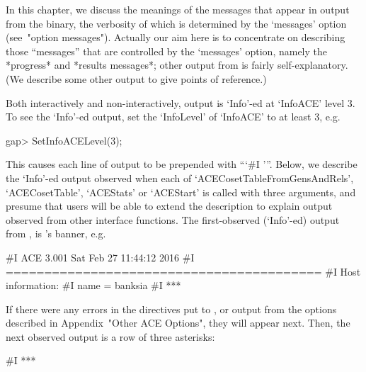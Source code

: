 

In this chapter, we discuss the meanings of the messages  that  appear
in output from the {\ACE} binary, the verbosity of which is determined
by the `messages' option (see~"option  messages").  Actually  our  aim
here is to concentrate  on  describing  those  ``messages''  that  are
controlled  by  the  `messages'  option,  namely  the  *progress*  and
*results   messages*;   other   output   from   {\ACE}    is    fairly
self-explanatory. (We describe some other output  to  give  points  of
reference.)

Both interactively and non-interactively, {\ACE} output  is  `Info'-ed
at `InfoACE' level 3. To see the  `Info'-ed  {\ACE}  output,  set  the
`InfoLevel' of `InfoACE' to at least 3, e.g.

\beginexample
gap> SetInfoACELevel(3);
\endexample

This  causes  each  line  of  {\ACE}  output  to  be  prepended   with
```\#I  '''.  Below,  we describe the `Info'-ed output  observed  when
each of `ACECosetTableFromGensAndRels', `ACECosetTable', `ACEStats' or
`ACEStart' is called with three arguments, and presume that users will
be able to extend the description  to  explain  output  observed  from
other  {\ACE}  interface  functions.  The  first-observed  (`Info'-ed)
output from {\ACE}, is {\ACE}'s banner, e.g.

\begintt
#I  ACE 3.001        Sat Feb 27 11:44:12 2016
#I  =========================================
#I  Host information:
#I    name = banksia
#I  ***
\endtt

If there were any errors in the directives put to  {\ACE},  or  output
from the options described in Appendix~"Other ACE Options", they  will
appear next. Then,  the  next  observed  output  is  a  row  of  three
asterisks:

\begintt
#I  ***
\endtt

